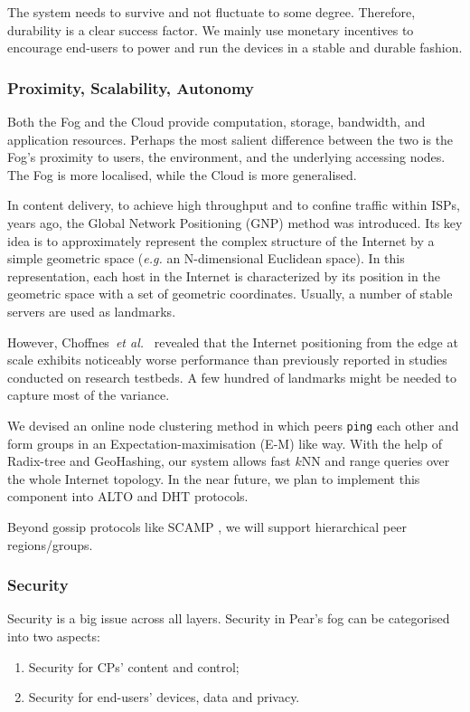 The system needs to survive and not fluctuate to some degree. Therefore, durability is a clear success factor. We mainly use monetary incentives to encourage end-users to power and run the devices in a stable and durable fashion. 

\subsubsection{Proximity, Scalability, Autonomy}
Both the Fog and the Cloud provide computation, storage, bandwidth, and application resources. Perhaps the most salient difference between the two is the Fog's proximity to users, the environment, and the underlying accessing nodes. The Fog is more localised, while the Cloud is more generalised. 

In content delivery, to achieve high throughput and to confine traffic within ISPs, years ago, the Global Network Positioning (GNP) method was introduced. Its key idea is to approximately represent the complex structure of the Internet by a simple geometric space ({\em e.g.} an N-dimensional Euclidean space). In this representation, each host in the Internet is characterized by its position in the geometric space with a set of geometric coordinates. Usually, a number of stable servers are used as landmarks. 

However, Choffnes~{\em et al.}~\cite{net-pos-edge} revealed that the Internet positioning from the edge at scale exhibits noticeably worse performance than previously reported in studies conducted on research testbeds. A few hundred of landmarks might be needed to capture most of the variance. 

We devised an online node clustering method in which peers \texttt{ping} each other and form groups in an Expectation-maximisation (E-M) like way. With the help of Radix-tree and GeoHashing, our system allows fast $k$NN and range queries over the whole Internet topology. 
In the near future, we plan to implement this component into ALTO and DHT protocols. 

Beyond gossip protocols like SCAMP \cite{SCAMP}, we will support hierarchical peer regions/groups.  

\subsubsection{Security}
Security is a big issue across all layers. Security in Pear's fog can be categorised into two aspects:
\begin{enumerate}
	\item Security for CPs' content and control;
	\item Security for end-users' devices, data and privacy. 
\end{enumerate} 


